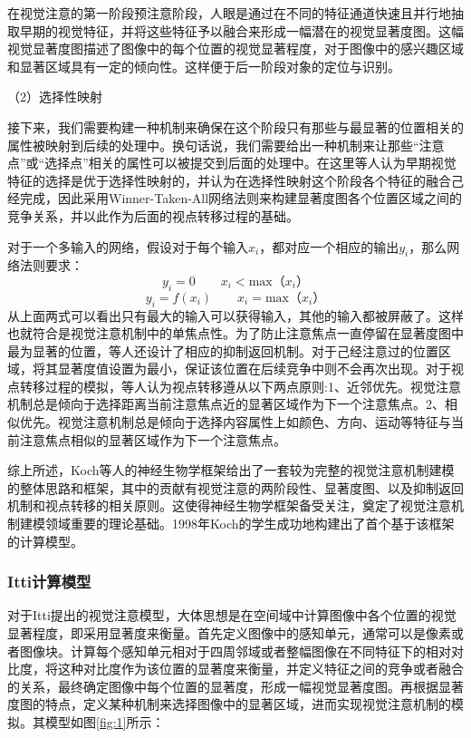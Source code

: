 \documentclass[a4paper,12pt]{article}
\begin{document}
在视觉注意的第一阶段预注意阶段，人眼是通过在不同的特征通道快速且并行地抽取早期的视觉特征，并将这些特征予以融合来形成一幅潜在的视觉显著度图。这幅视觉显著度图描述了图像中的每个位置的视觉显著程度，对于图像中的感兴趣区域和显著区域具有一定的倾向性。这样便于后一阶段对象的定位与识别。


（2）选择性映射

接下来，我们需要构建一种机制来确保在这个阶段只有那些与最显著的位置相关的属性被映射到后续的处理中。换句话说，我们需要给出一种机制来让那些“注意点”或“选择点”相关的属性可以被提交到后面的处理中。在这里等人认为早期视觉特征的选择是优于选择性映射的，并认为在选择性映射这个阶段各个特征的融合己经完成，因此采用Winner-Taken-All网络法则来构建显著度图各个位置区域之间的竞争关系，并以此作为后面的视点转移过程的基础。

对于一个多输入的网络，假设对于每个输入$x_{i}$，都对应一个相应的输出$y_{i}$，那么网络法则要求：
\begin{equation}
y_{i}=0\qquad x_{i}   < \textrm{max}（x_{i}）
\end{equation}
\begin{equation}
y_{i}=f(x_{i})\qquad  x_{i} = \textrm{max}（x_{i}）
\end{equation}
从上面两式可以看出只有最大的输入可以获得输入，其他的输入都被屏蔽了。这样也就符合是视觉注意机制中的单焦点性。为了防止注意焦点一直停留在显著度图中最为显著的位置，等人还设计了相应的抑制返回机制。对于己经注意过的位置区域，将其显著度值设置为最小，保证该位置在后续竞争中则不会再次出现。对于视点转移过程的模拟，等人认为视点转移遵从以下两点原则:1、近邻优先。视觉注意机制总是倾向于选择距离当前注意焦点近的显著区域作为下一个注意焦点。2、相似优先。视觉注意机制总是倾向于选择内容属性上如颜色、方向、运动等特征与当前注意焦点相似的显著区域作为下一个注意焦点。


综上所述，Koch等人的神经生物学框架给出了一套较为完整的视觉注意机制建模的整体思路和框架，其中的贡献有视觉注意的两阶段性、显著度图、以及抑制返回机制和视点转移的相关原则。这使得神经生物学框架备受关注，奠定了视觉注意机制建模领域重要的理论基础。1998年Koch的学生成功地构建出了首个基于该框架的计算模型。


\subsubsection{Itti计算模型}

对于Itti提出的视觉注意模型\cite{1:article}，大体思想是在空间域中计算图像中各个位置的视觉显著程度，即采用显著度来衡量。首先定义图像中的感知单元，通常可以是像素或者图像块。计算每个感知单元相对于四周邻域或者整幅图像在不同特征下的相对对比度，将这种对比度作为该位置的显著度来衡量，并定义特征之间的竞争或者融合的关系，最终确定图像中每个位置的显著度，形成一幅视觉显著度图。再根据显著度图的特点，定义某种机制来选择图像中的显著区域，进而实现视觉注意机制的模拟。其模型如图\ref{fig:1}所示：
\end{document}
